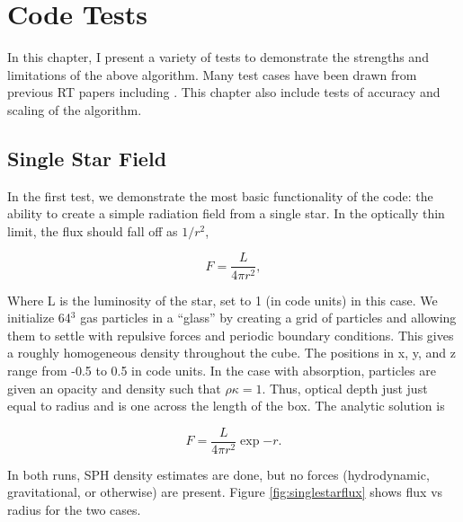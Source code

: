 \pagestyle{fancy}
\headheight 20pt
\chead{}
\lfoot{}
\cfoot{\thepage}
\rfoot{}
\renewcommand{\headrulewidth}{0.1pt}
\renewcommand{\footrulewidth}{0.1pt}


\chapter{Code Tests}
\label{chap:codetests}
\thispagestyle{fancy}

In this chapter, I present a variety of tests to demonstrate the strengths and limitations of the above algorithm. Many test cases have been drawn from previous RT papers including \citet{ilievEt06,gendelevKrumholz12,skinnerOstriker13}. This chapter also include tests of accuracy and scaling of the algorithm.

\section{Single Star Field}
\label{sec:glass}

In the first test, we demonstrate the most basic functionality of the code: the ability to create a simple radiation field from a single star. In the optically thin limit, the flux should fall off as $1/r^2$,

\begin{equation}
\label{eq:r2flux}
F = \frac{L}{4\pi r^2},
\end{equation}

Where L is the luminosity of the star, set to 1 (in code units) in this case. We initialize 64$^3$ gas particles in a ``glass'' by creating a grid of particles and allowing them to settle with repulsive forces and periodic boundary conditions. This gives a roughly homogeneous density throughout the cube. The positions in x, y, and z range from -0.5 to 0.5 in code units. In the case with absorption, particles are given an opacity and density such that $\rho\kappa = 1$. Thus,  optical depth just just equal to radius and is one across the length of the box. The analytic solution is

\begin{equation}
\label{eq:thickflux}
F = \frac{L}{4\pi r^2} \exp{-r}.
\end{equation}

In both runs, SPH density estimates are done, but no forces (hydrodynamic, gravitational, or otherwise) are present. Figure \ref{fig:singlestarflux} shows flux vs radius for the two cases.


